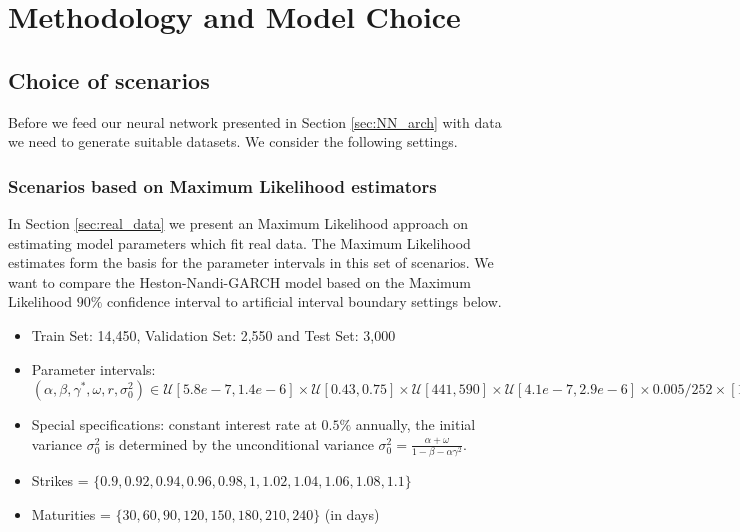 \documentclass{article}
\begin{document}
\section{Methodology and Model Choice}
\subsection{Choice of scenarios}\label{sec:scenarios}
Before we feed our neural network presented in Section \ref{sec:NN_arch} with data we need to generate suitable datasets. We consider the following settings.

\subsubsection{Scenarios based on Maximum Likelihood estimators}\label{sec:setupmle}
In Section \ref{sec:real_data} we present an Maximum Likelihood approach on estimating model parameters which fit real data. The Maximum Likelihood estimates form the basis for the parameter intervals in this set of scenarios. We want to compare the Heston-Nandi-GARCH model based on the Maximum Likelihood $90\%$ confidence interval to artificial interval boundary settings below.
\begin{itemize}
    \item Train Set: 14,450, Validation Set: 2,550 and Test Set: 3,000
    \item Parameter intervals: $(\alpha, \beta, \gamma^*, \omega, r ,\sigma_0^2) \in \mathcal{U}[5.8e-7, 1.4e-6] \times \mathcal{U}[0.43, 0.75] \times \mathcal{U}[441, 590] \times \mathcal{U}[4.1e-7, 2.9e-6] \times 0.005/252 \times [1.3e-4, 0.001]$
    \item Special specifications: constant interest rate at $0.5\%$ annually, the initial variance $\sigma_0^2$ is determined by the unconditional variance  $\sigma_0^2 = \frac{\alpha+\omega}{1-\beta-\alpha\gamma^2}$.
    \item Strikes = $\{0.9, 0.92, 0.94, 0.96, 0.98, 1, 1.02, 1.04, 1.06, 1.08, 1.1\}$
    \item Maturities = $\{30, 60, 90, 120, 150, 180, 210, 240\}$ (in days)
\end{itemize}
    
\end{document}
